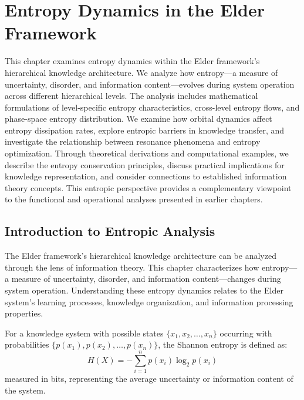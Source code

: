 \chapter{Entropy Dynamics in the Elder Framework}

\begin{tcolorbox}[colback=blue!5!white,colframe=blue!75!black,title=Chapter Summary]
This chapter examines entropy dynamics within the Elder framework's hierarchical knowledge architecture. We analyze how entropy—a measure of uncertainty, disorder, and information content—evolves during system operation across different hierarchical levels. The analysis includes mathematical formulations of level-specific entropy characteristics, cross-level entropy flows, and phase-space entropy distribution. We examine how orbital dynamics affect entropy dissipation rates, explore entropic barriers in knowledge transfer, and investigate the relationship between resonance phenomena and entropy optimization. Through theoretical derivations and computational examples, we describe the entropy conservation principles, discuss practical implications for knowledge representation, and consider connections to established information theory concepts. This entropic perspective provides a complementary viewpoint to the functional and operational analyses presented in earlier chapters.
\end{tcolorbox}

\section{Introduction to Entropic Analysis}

The Elder framework's hierarchical knowledge architecture can be analyzed through the lens of information theory. This chapter characterizes how entropy—a measure of uncertainty, disorder, and information content—changes during system operation. Understanding these entropy dynamics relates to the Elder system's learning processes, knowledge organization, and information processing properties.

\begin{definition}
For a knowledge system with possible states $\{x_1, x_2, \ldots, x_n\}$ occurring with probabilities $\{p(x_1), p(x_2), \ldots, p(x_n)\}$, the Shannon entropy is defined as:
\begin{equation}
H(X) = -\sum_{i=1}^{n} p(x_i) \log_2 p(x_i)
\end{equation}
measured in bits, representing the average uncertainty or information content of the system.
\end{definition}

